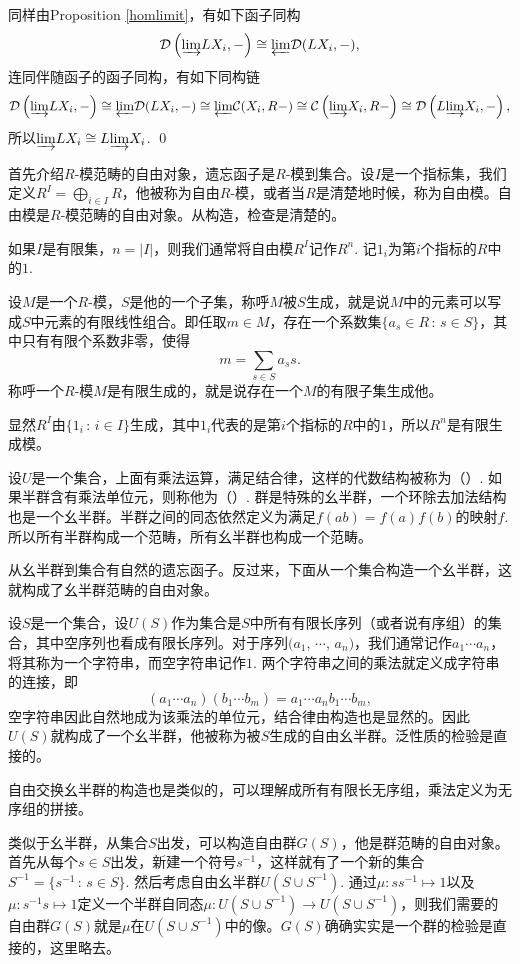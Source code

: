 	同样由Proposition \eqref{homlimit}，有如下函子同构
	\[
	\mathcal{D}\left({\varinjlim} LX_i,-\right)\cong {\varprojlim} \mathcal{D}(LX_i,-),
	\]
	连同伴随函子的函子同构，有如下同构链
	\[
	\mathcal{D}\left({\varinjlim} LX_i,-\right)\cong {\varprojlim} \mathcal{D}(LX_i,-)\cong {\varprojlim} \mathcal{C}(X_i,R-)\cong \mathcal{C}\left({\varinjlim} X_i,R-\right)\cong \mathcal{D}\left(L{\varinjlim} X_i,-\right),
	\]
	所以${\varinjlim} LX_i\cong L{\varinjlim} X_i$.
\qed

\para 首先介绍$R$-模范畴的自由对象，遗忘函子是$R$-模到集合。设$I$是一个指标集，我们定义$R^I=\bigoplus_{i\in I}R$，他被称为自由$R$-模，或者当$R$是清楚地时候，称为自由模。自由模是$R$-模范畴的自由对象。从构造，检查是清楚的。

如果$I$是有限集，$n=|I|$，则我们通常将自由模$R^I$记作$R^n$. 记$1_i$为第$i$个指标的$R$中的$1$.

\para 设$M$是一个$R$-模，$S$是他的一个子集，称呼$M$被$S$生成，就是说$M$中的元素可以写成$S$中元素的有限线性组合。即任取$m\in M$，存在一个系数集$\{a_s\in R\,:\, s\in S\}$，其中只有有限个系数非零，使得
\[
	m=\sum_{s\in S}a_s s.
\]
称呼一个$R$-模$M$是有限生成的，就是说存在一个$M$的有限子集生成他。

显然$R^I$由$\{1_i\,:\,i\in I\}$生成，其中$1_i$代表的是第$i$个指标的$R$中的$1$，所以$R^n$是有限生成模。

\para 设$U$是一个集合，上面有乘法运算，满足结合律，这样的代数结构被称为（）. 如果半群含有乘法单位元，则称他为（）. 群是特殊的幺半群，一个环除去加法结构也是一个幺半群。半群之间的同态依然定义为满足$f(ab)=f(a)f(b)$的映射$f$. 所以所有半群构成一个范畴，所有幺半群也构成一个范畴。

从幺半群到集合有自然的遗忘函子。反过来，下面从一个集合构造一个幺半群，这就构成了幺半群范畴的自由对象。

设$S$是一个集合，设$U(S)$作为集合是$S$中所有有限长序列（或者说有序组）的集合，其中空序列也看成有限长序列。对于序列$(a_1$, $\cdots$, $a_n)$，我们通常记作$a_1\cdots a_n$，将其称为一个字符串，而空字符串记作$1$. 两个字符串之间的乘法就定义成字符串的连接，即
\[
	(a_1\cdots a_n)(b_1\cdots b_m)=a_1\cdots a_nb_1\cdots b_m,
\]
空字符串因此自然地成为该乘法的单位元，结合律由构造也是显然的。因此$U(S)$就构成了一个幺半群，他被称为被$S$生成的自由幺半群。泛性质的检验是直接的。

自由交换幺半群的构造也是类似的，可以理解成所有有限长无序组，乘法定义为无序组的拼接。

\para 类似于幺半群，从集合$S$出发，可以构造自由群$G(S)$，他是群范畴的自由对象。首先从每个$s\in S$出发，新建一个符号$s^{-1}$，这样就有了一个新的集合$S^{-1}=\{s^{-1}\,:\, s\in S\}$. 然后考虑自由幺半群$U(S\cup S^{-1})$. 通过$\mu: ss^{-1}\mapsto 1$以及$\mu: s^{-1}s\mapsto 1$定义一个半群自同态$\mu:U(S\cup S^{-1})\to U(S\cup S^{-1})$，则我们需要的自由群$G(S)$就是$\mu$在$U(S\cup S^{-1})$中的像。$G(S)$确确实实是一个群的检验是直接的，这里略去。

